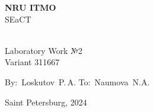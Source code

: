 \documentclass[12pt]{article}
\begin{document}
	\begin{center}
		\thispagestyle{empty}
		\LARGE
		\textbf{NRU ITMO}\\
		SEaCT\\
		
		\vspace{7cm}
		
		\huge
		
		\textbf{}\\
		Laboratory Work №2\\
		\vspace{1cm}
		\Large
		Variant 311667
		
		\LARGE
		\vspace{5cm}
		\vbox{
			\hfill
			\vbox{
				\hbox{By: Loskutov P.\,A.}
				\hbox{To: Naumova N.A.}
			}
		} 
		
		\vspace{4.5cm}
		Saint Petersburg, 2024
		\newpage
	\end{center}
\end{document}

